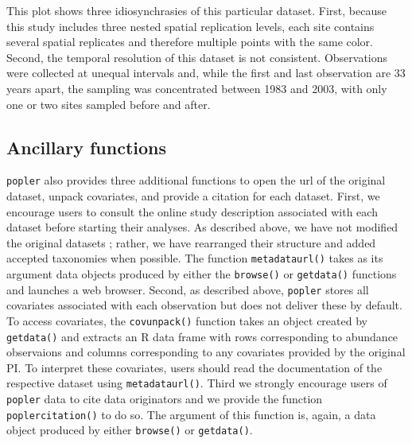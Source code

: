\documentclass{article}\usepackage[]{graphicx}\usepackage[]{color}
\begin{document}
This plot shows three idiosynchrasies of this particular dataset. First, because this study includes three nested spatial replication levels, each site contains several spatial replicates and therefore multiple points with the same color. Second, the temporal resolution of this dataset is not consistent. Observations were collected at unequal intervals and, while the first and last observation are 33 years apart, the sampling was concentrated between 1983 and 2003, with only one or two sites sampled before and after. 

\subsection*{Ancillary functions}
\texttt{popler} also provides three additional functions to open the url of the original dataset, unpack covariates, and provide a citation for each dataset. First, we encourage users to consult the online study description associated with each dataset before starting their analyses. As described above, we have not modified the original datasets ; rather, we have rearranged their structure and added accepted taxonomies when possible. The function \texttt{metadata\textunderscore url()} takes as its argument data objects produced by either the \texttt{browse()} or \texttt{get\textunderscore data()} functions and launches a web browser. Second, as described above, \texttt{popler} stores all covariates associated with each observation but does not deliver these by default. To access covariates, the \texttt{cov\textunderscore unpack()} function takes an object created by \texttt{get\textunderscore data()} and extracts an R data frame with rows corresponding to abundance observaions and columns corresponding to any covariates provided by the original PI. To interpret these covariates, users should read the documentation of the respective dataset using \texttt{metadata\textunderscore url()}. Third we strongly encourage users of \texttt{popler} data to cite data originators and we provide the function \texttt{popler\textunderscore citation()} to do so. The argument of this function is, again, a data object produced by either \texttt{browse()} or \texttt{get\textunderscore data()}.
\end{document}
